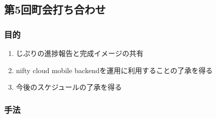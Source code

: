 \subsection{第5回町会打ち合わせ}
\subsubsection{目的}
\begin{enumerate}
    \item じぷりの進捗報告と完成イメージの共有
    \item nifty cloud mobile backendを運用に利用することの了承を得る
    \item 今後のスケジュールの了承を得る
\end{enumerate}

\subsubsection{手法}
